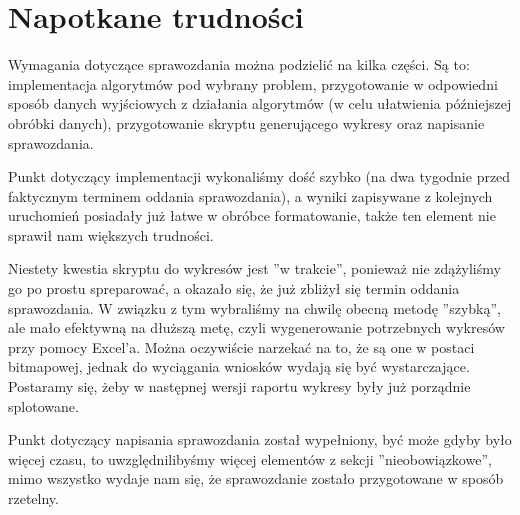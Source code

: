 \section{Napotkane trudności}
Wymagania dotyczące sprawozdania można podzielić na kilka części. Są to: implementacja algorytmów pod wybrany problem, przygotowanie w odpowiedni sposób danych wyjściowych z działania algorytmów (w celu ułatwienia późniejszej obróbki danych), przygotowanie skryptu generującego wykresy oraz napisanie sprawozdania.

Punkt dotyczący implementacji wykonaliśmy dość szybko (na dwa tygodnie przed faktycznym terminem oddania sprawozdania), a wyniki zapisywane z kolejnych uruchomień posiadały już łatwe w obróbce formatowanie, także ten element nie sprawił nam większych trudności.

Niestety kwestia skryptu do wykresów jest ''w trakcie'', ponieważ nie zdążyliśmy go po prostu spreparować, a okazało się, że już zbliżył się termin oddania sprawozdania. W związku z tym wybraliśmy na chwilę obecną metodę ''szybką'', ale mało efektywną na dłuższą metę, czyli wygenerowanie potrzebnych wykresów przy pomocy Excel'a. Można oczywiście narzekać na to, że są one w postaci bitmapowej, jednak do wyciągania wniosków wydają się być wystarczające. Postaramy się, żeby w następnej wersji raportu wykresy były już porządnie splotowane.

Punkt dotyczący napisania sprawozdania został wypełniony, być może gdyby było więcej czasu, to uwzględnilibyśmy więcej elementów z sekcji ''nieobowiązkowe'', mimo wszystko wydaje nam się, że sprawozdanie zostało przygotowane w sposób rzetelny.